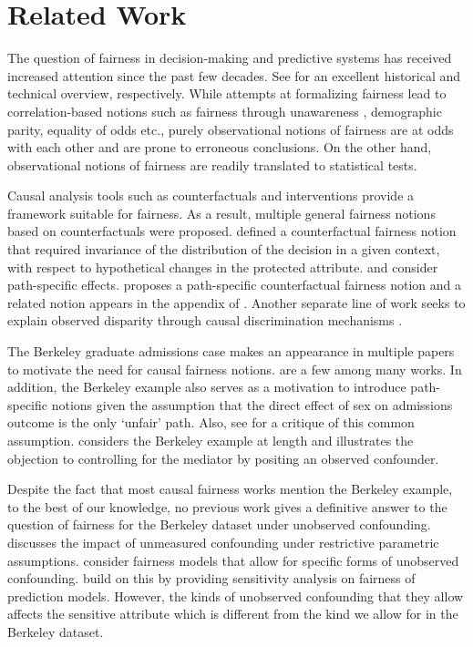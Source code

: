 \section{Related Work}
The question of fairness in decision-making and predictive systems has received increased attention since the past few decades. See \citet{HutchinsonMitchell19,BarocasHN23} for an excellent historical  and technical overview, respectively. While attempts at formalizing fairness lead to correlation-based notions such as fairness through unawareness \citep{DworkHPRZ12}, demographic parity, equality of odds \citep{HardtPS16} etc., purely observational notions of fairness are at odds with each other \cite{Chouldechova17, KleinbergMR17} and are prone to erroneous conclusions. On the other hand, observational notions of fairness are readily translated to statistical tests.

Causal analysis tools such as counterfactuals and interventions provide a framework suitable for fairness. As a result, multiple general fairness notions based on counterfactuals were proposed.  \citet{KusnerLRS17} defined a counterfactual fairness notion that required invariance of the distribution of the decision in a given context, with respect to hypothetical changes in the protected attribute. \citet{NabiShpitser18} and \citet{ZhangWW17} consider path-specific effects. \citet{Chiappa19} proposes a path-specific counterfactual fairness notion and a related notion appears in the appendix of \citet{KusnerLRS17}. Another separate line of work seeks to explain observed disparity through causal discrimination mechanisms \citep{ZhangBareinboim18, plecko2022causal}.

The Berkeley graduate admissions case makes an appearance in multiple papers to motivate the need for causal fairness notions. \cite{KilbertusRPHJS17, plecko2022causal,KusnerLRS17,Chiappa19,BerkKT23} are a few among many works. In addition, the Berkeley example also serves as a motivation to introduce path-specific notions given the assumption that the direct effect of sex on admissions outcome is the only `unfair' path. Also, see \citet{BarocasHN23} for a critique of this common assumption. \citet{Pearl09} considers the Berkeley example at length and illustrates the objection to controlling for the mediator by positing an observed confounder. 

Despite the fact that most causal fairness works mention the Berkeley example, to the best of our knowledge, no previous work gives a definitive answer to the question of fairness for the Berkeley dataset under unobserved confounding. \citet{KilbertusBKWS20} discusses the impact of unmeasured confounding under restrictive parametric assumptions. \citet{ZhangBareinboim18, plecko2022causal} consider fairness models that allow for specific forms of unobserved confounding. \citet{SchroderFF24} build on this by providing sensitivity analysis on fairness of prediction models. However, the kinds of unobserved confounding that they allow affects the sensitive attribute which is different from the kind we allow for in the Berkeley dataset. 

